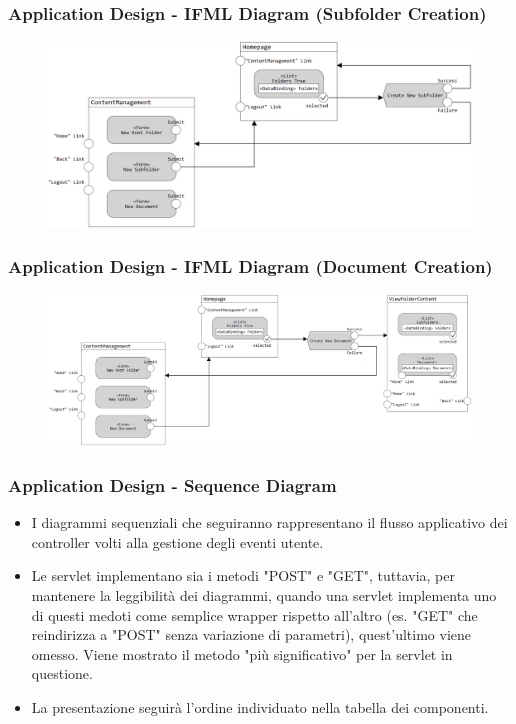 \documentclass[aspectratio=169]{beamer}
\begin{document}
\begin{frame}
    \frametitle{Application Design - IFML Diagram (Subfolder Creation)}
    \begin{figure}
        \centering
        \includegraphics[width=0.9\linewidth]{Resources/IFMLs/images/IFML - Subfolder Creation.png}
    \end{figure}
\end{frame}

\begin{frame}
    \frametitle{Application Design - IFML Diagram (Document Creation)}
    \begin{figure}
        \centering
        \includegraphics[width=0.9\linewidth]{Resources/IFMLs/images/IFML - Document Creation.png}
    \end{figure}
\end{frame}

\begin{frame}
    \frametitle{Application Design - Sequence Diagram}
    \begin{itemize}
        \item I diagrammi sequenziali che seguiranno rappresentano il flusso applicativo dei controller volti alla
              gestione degli eventi utente.
        \item Le servlet implementano sia i metodi "POST" e "GET", tuttavia, per mantenere la leggibilità dei diagrammi,
              quando una servlet implementa uno di questi medoti come semplice wrapper rispetto all'altro (es. "GET" che
              reindirizza a "POST" senza variazione di parametri), quest'ultimo viene omesso. Viene mostrato il metodo
              "più significativo" per la servlet in questione.
        \item La presentazione seguirà l'ordine individuato nella tabella dei componenti.
    \end{itemize}
\end{frame}
\end{document}
